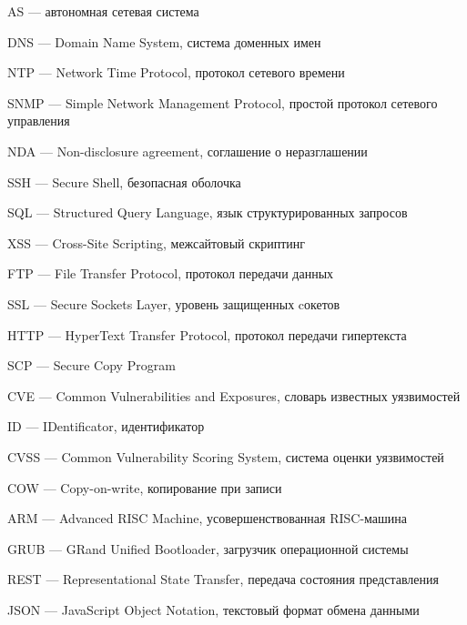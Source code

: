 \hypertarget{as}{AS --- автономная сетевая система}

\hypertarget{dns}{DNS --- Domain Name System, система доменных имен}

\hypertarget{ntp}{NTP --- Network Time Protocol, протокол сетевого времени}

\clearpage

\hypertarget{snmp}{SNMP --- Simple Network Management Protocol, простой протокол сетевого управления}

\hypertarget{nda}{NDA --- Non-disclosure agreement, соглашение о неразглашении}

\hypertarget{ssh}{SSH --- Secure Shell, безопасная оболочка}

\hypertarget{sql}{SQL --- Structured Query Language, язык структурированных запросов}

\hypertarget{xss}{XSS --- Cross-Site Scripting, межсайтовый скриптинг}

\hypertarget{ftp}{FTP --- File Transfer Protocol, протокол передачи данных}

\hypertarget{ssl}{SSL --- Secure Sockets Layer, уровень защищенных cокетов}

\hypertarget{http}{HTTP --- HyperText Transfer Protocol, протокол передачи гипертекста}

\hypertarget{scp}{SCP --- Secure Copy Program}

\hypertarget{cve}{CVE --- Common Vulnerabilities and Exposures, словарь известных уязвимостей}

\hypertarget{id}{ID --- IDentificator, идентификатор}

\hypertarget{cvss}{CVSS --- Common Vulnerability Scoring System, система оценки уязвимостей}

\hypertarget{cow}{COW --- Copy-on-write, копирование при записи}

\hypertarget{arm}{ARM --- Advanced RISC Machine, усовершенствованная RISC-машина}

\hypertarget{grub}{GRUB --- GRand Unified Bootloader, загрузчик операционной системы}

\hypertarget{rest}{REST --- Representational State Transfer, передача состояния представления}

\hypertarget{json}{JSON --- JavaScript Object Notation, текстовый формат обмена данными}

\clearpage
